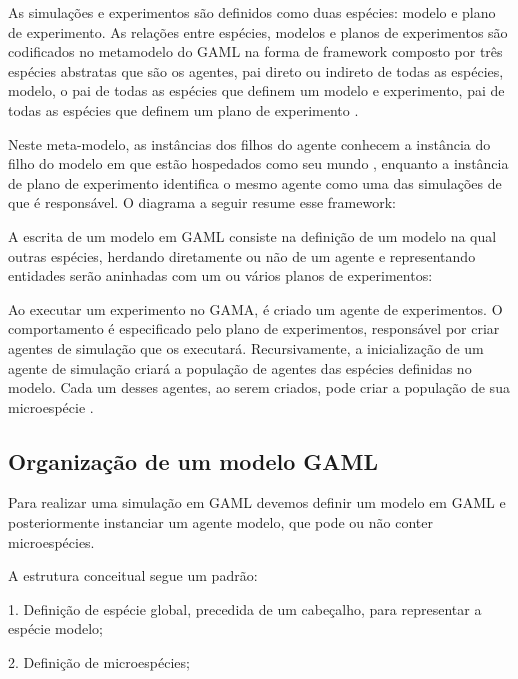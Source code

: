 As simulações e experimentos são definidos como duas espécies: modelo e plano de experimento. As relações entre espécies, modelos e planos de experimentos são codificados no metamodelo do GAML na forma de framework composto por três espécies abstratas que são os agentes, pai direto ou indireto de todas as espécies, modelo, o pai de todas as espécies que definem um modelo e experimento, pai de todas as espécies que definem um plano de experimento \cite{gamaplataform}.

Neste meta-modelo, as instâncias dos filhos do agente conhecem a instância do filho do modelo em que estão hospedados como seu mundo , enquanto a instância de plano de experimento identifica o mesmo agente como uma das simulações de que é responsável. O diagrama a seguir resume esse framework:


A escrita de um modelo em GAML consiste na definição de um modelo na qual outras espécies, herdando diretamente ou não de um agente e representando entidades serão aninhadas com um ou vários planos de experimentos:

Ao executar um experimento no GAMA, é criado um agente de experimentos. O comportamento é especificado pelo plano de experimentos, responsável por criar agentes de simulação que os executará. Recursivamente, a inicialização de um agente de simulação criará a população de agentes das espécies definidas no modelo. Cada um desses agentes, ao serem criados, pode criar a população de sua microespécie \cite{gamaplataform}. 


\subsection{Organização de um modelo GAML}

Para realizar uma simulação em GAML devemos definir um modelo em GAML e posteriormente instanciar um agente modelo, que pode ou não conter microespécies.

A estrutura conceitual segue um padrão:

1. Definição de espécie global, precedida de um cabeçalho, para representar a espécie modelo;

2. Definição de microespécies;

